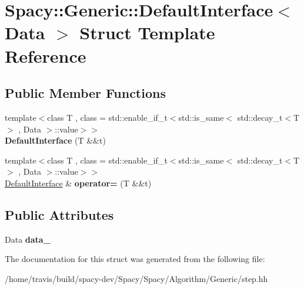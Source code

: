 \hypertarget{structSpacy_1_1Generic_1_1DefaultInterface}{\section{Spacy\-:\-:Generic\-:\-:Default\-Interface$<$ Data $>$ Struct Template Reference}
\label{structSpacy_1_1Generic_1_1DefaultInterface}
}
\subsection*{Public Member Functions}
\begin{DoxyCompactItemize}
\item 
\hypertarget{structSpacy_1_1Generic_1_1DefaultInterface_a77f00f53c09087dab3cb751f1580b327}{{\footnotesize template$<$class T , class  = std\-::enable\-\_\-if\-\_\-t$<$std\-::is\-\_\-same$<$ std\-::decay\-\_\-t$<$\-T$>$ , Data $>$\-::value$>$$>$ }\\{\bfseries Default\-Interface} (T \&\&t)}\label{structSpacy_1_1Generic_1_1DefaultInterface_a77f00f53c09087dab3cb751f1580b327}

\item 
\hypertarget{structSpacy_1_1Generic_1_1DefaultInterface_ac439759218c6df1f8f7cbf38e4be51a5}{{\footnotesize template$<$class T , class  = std\-::enable\-\_\-if\-\_\-t$<$std\-::is\-\_\-same$<$ std\-::decay\-\_\-t$<$\-T$>$ , Data $>$\-::value$>$$>$ }\\\hyperlink{structSpacy_1_1Generic_1_1DefaultInterface}{Default\-Interface} \& {\bfseries operator=} (T \&\&t)}\label{structSpacy_1_1Generic_1_1DefaultInterface_ac439759218c6df1f8f7cbf38e4be51a5}

\end{DoxyCompactItemize}
\subsection*{Public Attributes}
\begin{DoxyCompactItemize}
\item 
\hypertarget{structSpacy_1_1Generic_1_1DefaultInterface_afacc26987a814ebe95292ff45c9744bd}{Data {\bfseries data\-\_\-}}\label{structSpacy_1_1Generic_1_1DefaultInterface_afacc26987a814ebe95292ff45c9744bd}

\end{DoxyCompactItemize}


The documentation for this struct was generated from the following file\-:\begin{DoxyCompactItemize}
\item 
/home/travis/build/spacy-\/dev/\-Spacy/\-Spacy/\-Algorithm/\-Generic/step.\-hh\end{DoxyCompactItemize}
